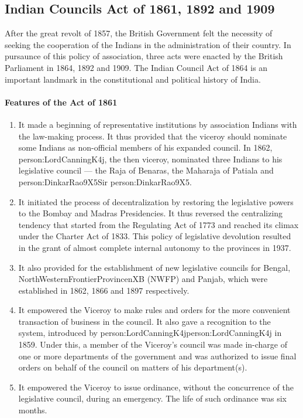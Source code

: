 \subsection{Indian Councils Act of 1861, 1892 and 1909}

After the great revolt of 1857, the British Government felt the necessity of seeking the cooperation of the Indians in the administration of their country. In pursaunce of this policy of association, three acts were enacted by the British Parliament in 1864, 1892 and 1909. The Indian Council Act of 1864 is an important landmark in the constitutional and political history of India.

\paragraph{Features of the Act of 1861}
\begin{enumerate}
  \item It made a beginning of representative institutions by association Indians with the law-making process. It thus provided that the viceroy should nominate some Indians as non-official members of his expanded council. In 1862, \gls{person:LordCanningK4j}, the then viceroy, nominated three Indians to his legislative council — the Raja of Benaras, the Maharaja of Patiala and \gls{person:DinkarRao9X5}Sir \gls{person:DinkarRao9X5}.
  \item It initiated the process of decentralization by restoring the legislative powers to the Bombay and Madras Presidencies. It thus reversed the centralizing tendency that started from the Regulating Act of 1773 and reached its climax under the Charter Act of 1833. This policy of legislative devolution resulted in the grant of almost complete internal autonomy to the provinces in 1937.
  \item It also provided for the establishment of new legislative councils for Bengal, \gls{NorthWesternFrontierProvincenXB} (NWFP) and Panjab, which were established in 1862, 1866 and 1897 respectively.
  \item It empowered the Viceroy to make rules and orders for the more convenient transaction of business in the council. It also gave a recognition to the   system, introduced by \gls{person:LordCanningK4j}\gls{person:LordCanningK4j} in 1859. Under this, a member of the Viceroy's council was made in-charge of one or more departments of the government and was authorized to issue final orders on behalf of the council on matters of his department(s).
  \item It empowered the Viceroy to issue ordinance, without the concurrence of the legislative council, during an emergency. The life of such ordinance was six months.
\end{enumerate}

